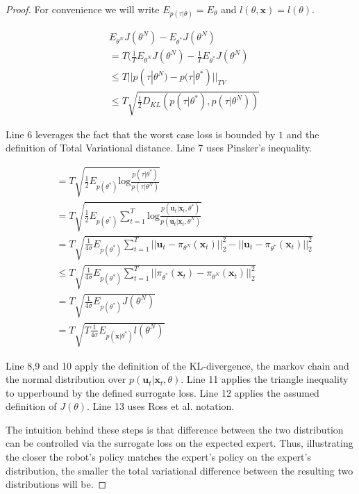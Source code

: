 \documentclass[10pt, conference]{ieeeconf}      %
\newcommand{\bu}{\mathbf{u}}
\newcommand{\bx}{\mathbf{x}}
\begin{document}
\begin{proof}
For convenience we will write $E_{p(\tau|\theta)} = E_{\theta}$ and $l(\theta,\bx) = l(\theta)$. 

\begin{align}
&E_{\theta^N} J(\theta^N) - E_{\theta^*} J(\theta^N) \\
&= T(\frac{1}{T}E_{\theta^N} J(\theta^N) -\frac{1}{T}E_{\theta^*} J(\theta^N)\\
&\leq  T| | p(\tau|\theta^N) - p(\tau|\theta^*)||_{TV}\\
&\leq T\sqrt{\frac{1}{2} D_{KL}(p(\tau|\theta^*),p(\tau|\theta^N))}
\end{align}

 Line 6 leverages the fact that the worst case loss is bounded by $1$ and the definition of Total Variational distance. Line 7 uses Pinsker's inequality. 


\begin{align}
&= T\sqrt{\frac{1}{2} E_{p(\theta^*)} \mbox{log} \frac{p(\tau|\theta^*)}{p(\tau|\theta^N)}}\\
&= T\sqrt{\frac{1}{2} E_{p(\theta^*)} \sum^T_{t=1}\mbox{log} \frac{p(\bu_t|\bx_t,\theta^*)}{p(\bu_t|\bx_t,\theta^N)}}\\
&= T\sqrt{\frac{1}{4\sigma} E_{p(\theta^*)} \sum^T_{t=1} ||\bu_t- \pi_{\theta^N}(\bx_t)||_2^2 - ||\bu_t- \pi_{\theta^*}(\bx_t)||_2^2}\\
&\leq T\sqrt{\frac{1}{4\sigma} E_{p(\theta^*)} \sum^T_{t=1}  ||\pi_{\theta^*}(\bx_t) - \pi_{\theta^N}(\bx_t)||_2^2}\\
&= T\sqrt{\frac{1}{4\sigma} E_{p(\theta^*)} J(\theta^N)}\\
&= T\sqrt{T \frac{1}{4\sigma} E_{p(\bx|\theta^*)} l(\theta^N)}
\end{align}

Line 8,9 and 10 apply the definition of the KL-divergence, the markov chain and the normal distribution over $p(\bu_t|\bx_t,\theta)$. Line 11 applies the triangle inequality to upperbound by the defined surrogate loss. Line 12 applies the assumed definition of $J(\theta)$. Line 13 uses Ross et al. notation. 

The intuition behind these steps is that difference between  the two distribution can be controlled via the surrogate loss on the expected expert. Thus, illustrating the closer the robot's policy matches the expert's policy on the expert's distribution, the smaller the total variational difference between the resulting two distributions will be. 
\end{proof}
  
\end{document}
